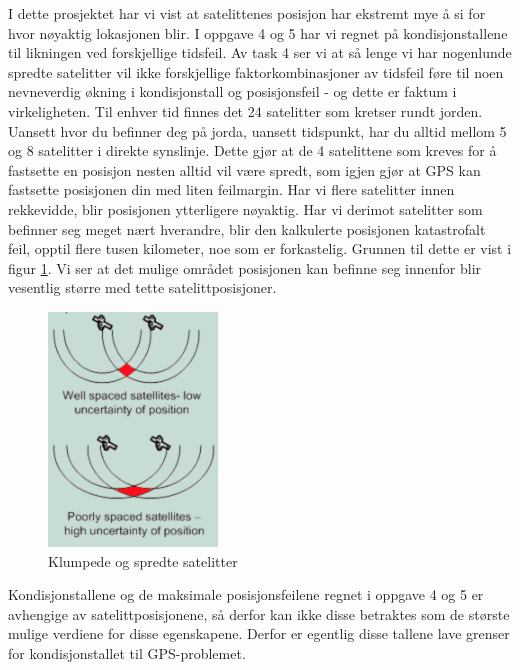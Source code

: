 I dette prosjektet har vi vist at satelittenes posisjon har ekstremt mye å si for hvor nøyaktig lokasjonen blir. I oppgave 4 og 5 har vi regnet på kondisjonstallene til likningen ved forskjellige tidsfeil. Av task 4 ser vi at så lenge vi har nogenlunde spredte satelitter vil ikke forskjellige faktorkombinasjoner av tidsfeil føre til noen nevneverdig økning i kondisjonstall og posisjonsfeil - og dette er faktum i virkeligheten. Til enhver tid finnes det 24 satelitter som kretser rundt jorden. Uansett hvor du befinner deg på jorda, uansett tidspunkt, har du alltid mellom 5 og 8 satelitter i direkte synslinje. Dette gjør at de 4 satelittene som kreves for å fastsette en posisjon nesten alltid vil være spredt, som igjen gjør at GPS kan fastsette posisjonen din med liten feilmargin. Har vi flere satelitter innen rekkevidde, blir posisjonen ytterligere nøyaktig. Har vi derimot satelitter som befinner seg meget nært hverandre, blir den kalkulerte posisjonen katastrofalt feil, opptil flere tusen kilometer, noe som er forkastelig. Grunnen til dette er vist i figur \ref{fig:bunchedsat}. Vi ser at det mulige området posisjonen kan befinne seg innenfor blir vesentlig større med tette satelittposisjoner.

\begin{figure}[htbp]
	\centering
	\includegraphics[width=0.4\textwidth]{sections/Conclusion/bunchedsat.png}
	\caption{Klumpede og spredte satelitter}
	\label{fig:bunchedsat}
\end{figure}

Kondisjonstallene og de maksimale posisjonsfeilene regnet i oppgave 4 og 5 er avhengige av satelittposisjonene, så derfor kan ikke disse betraktes som de største mulige verdiene for disse egenskapene. Derfor er egentlig disse tallene lave grenser for kondisjonstallet til GPS-problemet. 

\vspace{5mm}

